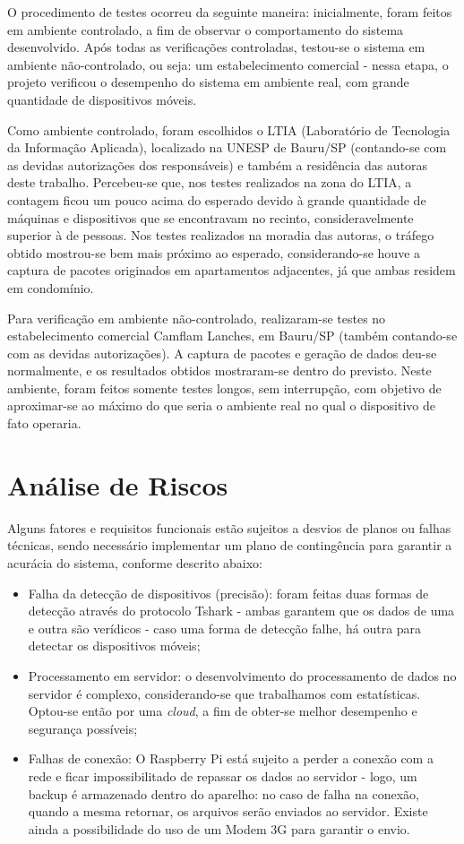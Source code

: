 O procedimento de testes ocorreu da seguinte maneira: inicialmente, foram feitos em ambiente controlado, a fim de observar o comportamento do sistema desenvolvido. Após todas as verificações controladas, testou-se o sistema em ambiente não-controlado, ou seja: um estabelecimento comercial - nessa etapa, o projeto verificou o desempenho do sistema em ambiente real, com grande quantidade de dispositivos móveis. 

Como ambiente controlado, foram escolhidos o LTIA (Laboratório de Tecnologia da Informação Aplicada), localizado na UNESP de Bauru/SP (contando-se com as devidas autorizações dos responsáveis) e também a residência das autoras deste trabalho. Percebeu-se que, nos testes realizados na zona do LTIA, a contagem ficou um pouco acima do esperado devido à grande quantidade de máquinas e dispositivos que se encontravam no recinto, consideravelmente superior à de pessoas. Nos testes realizados na moradia das autoras, o tráfego obtido mostrou-se bem mais próximo ao esperado, considerando-se houve a captura de pacotes originados em  apartamentos adjacentes, já que ambas residem em condomínio.

Para verificação em ambiente não-controlado, realizaram-se testes no estabelecimento comercial Camflam Lanches, em Bauru/SP (também contando-se com as devidas autorizações). A captura de pacotes e geração de dados deu-se normalmente, e os resultados obtidos mostraram-se dentro do previsto. Neste ambiente, foram feitos somente testes longos, sem interrupção, com objetivo de aproximar-se ao máximo do que seria o ambiente real no qual o dispositivo de fato operaria.

\section{Análise de Riscos}
Alguns fatores e requisitos funcionais estão sujeitos a desvios de planos ou falhas técnicas, sendo necessário implementar um plano de contingência para garantir a acurácia do sistema, conforme descrito abaixo:

\begin{itemize}
  \item Falha da detecção de dispositivos (precisão): foram feitas duas formas de detecção através do protocolo Tshark - ambas garantem que os dados de uma e outra são verídicos - caso uma forma de detecção falhe, há outra para detectar os dispositivos móveis;
  \item Processamento em servidor: o desenvolvimento do processamento de dados no servidor é complexo, considerando-se que trabalhamos com estatísticas. Optou-se então por uma \emph{cloud}, a fim de obter-se melhor desempenho e segurança possíveis;
  \item Falhas de conexão: O Raspberry Pi está sujeito a perder a conexão com a rede e ficar impossibilitado de repassar os dados ao servidor - logo, um backup é armazenado dentro do aparelho: no caso de falha na conexão, quando a mesma retornar, os arquivos serão enviados ao servidor. Existe ainda a possibilidade do uso de um Modem 3G para garantir o envio.
\end{itemize}
